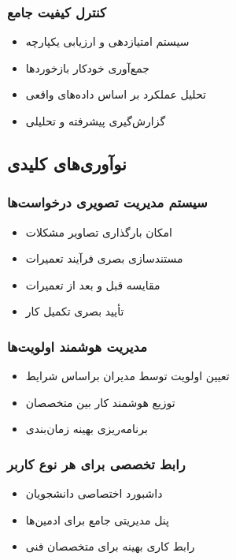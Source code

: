 \documentclass[12pt,a4paper]{report}
\begin{document}
	\subsubsection{کنترل کیفیت جامع}
	\begin{itemize}
		\item سیستم امتیازدهی و ارزیابی یکپارچه
		\item جمع‌آوری خودکار بازخوردها
		\item تحلیل عملکرد بر اساس داده‌های واقعی
		\item گزارش‌گیری پیشرفته و تحلیلی
	\end{itemize}
	
	\subsection{نوآوری‌های کلیدی}
	
	\subsubsection{سیستم مدیریت تصویری درخواست‌ها}
	\begin{itemize}
		\item امکان بارگذاری تصاویر مشکلات
		\item مستندسازی بصری فرآیند تعمیرات
		\item مقایسه قبل و بعد از تعمیرات
		\item تأیید بصری تکمیل کار
	\end{itemize}
	
	\subsubsection{مدیریت هوشمند اولویت‌ها}
	\begin{itemize}
		\item تعیین اولویت توسط مدیران براساس شرایط
		\item توزیع هوشمند کار بین متخصصان
		\item برنامه‌ریزی بهینه زمان‌بندی
	\end{itemize}
	
	\subsubsection{رابط تخصصی برای هر نوع کاربر}
	\begin{itemize}
		\item داشبورد اختصاصی دانشجویان
		\item پنل مدیریتی جامع برای ادمین‌ها
		\item رابط کاری بهینه برای متخصصان فنی
	\end{itemize}
	
\end{document}
